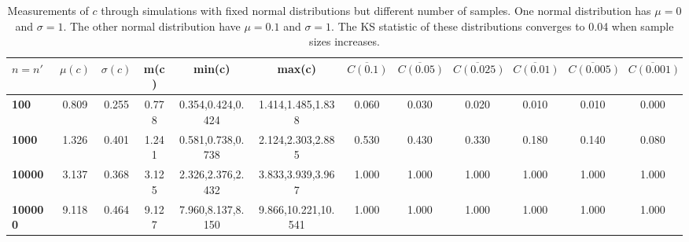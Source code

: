 \begin{table*}[h!]
\vspace{-.3cm}
\begin{center}
\begin{tabular}{| l | c | c | c | c | c | c | c | c | c | c | c |}\hline
$n=n'$ & $\mu(c)$ & $\sigma(c)$ & m(c) & min(c) & max(c) & $\overline{C(0.1)}$ & $\overline{C(0.05)}$ & $\overline{C(0.025)}$ & $\overline{C(0.01)}$ & $\overline{C(0.005)}$ & $\overline{C(0.001)}$ \\\hline\hline
{\bf 100} & 0.809 & 0.255 & 0.778 & 0.354,0.424,0.424 & 1.414,1.485,1.838 & 0.060 & 0.030 & 0.020 & 0.010 & 0.010 & 0.000 \\\hline
{\bf 1000} & 1.326 & 0.401 & 1.241 & 0.581,0.738,0.738 & 2.124,2.303,2.885 & 0.530 & 0.430 & 0.330 & 0.180 & 0.140 & 0.080 \\\hline
{\bf 10000} & 3.137 & 0.368 & 3.125 & 2.326,2.376,2.432 & 3.833,3.939,3.967 & 1.000 & 1.000 & 1.000 & 1.000 & 1.000 & 1.000 \\\hline
{\bf 100000} & 9.118 & 0.464 & 9.127 & 7.960,8.137,8.150 & 9.866,10.221,10.541 & 1.000 & 1.000 & 1.000 & 1.000 & 1.000 & 1.000 \\\hline
\end{tabular}
\caption{Measurements of $c$ through simulations
        with fixed normal distributions but different number of samples.
        One normal distribution has $\mu=0$ and $\sigma=1$.
        The other normal distribution have $\mu=0.1$ and $\sigma=1$.
        The KS statistic of these distributions converges
        to 0.04 when sample sizes increases.}
\end{center}
\end{table*}